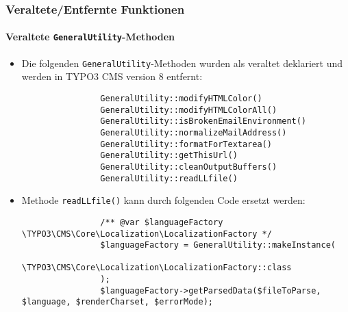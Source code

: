 \begin{frame}[fragile]
	\frametitle{Veraltete/Entfernte Funktionen}
	\framesubtitle{Veraltete \texttt{GeneralUtility}-Methoden}

	\lstset{basicstyle=\tiny\ttfamily}

	\begin{itemize}
		\item Die folgenden \texttt{GeneralUtility}-Methoden wurden als veraltet deklariert und werden in
			TYPO3 CMS version 8 entfernt:

			\begin{lstlisting}
				GeneralUtility::modifyHTMLColor()
				GeneralUtility::modifyHTMLColorAll()
				GeneralUtility::isBrokenEmailEnvironment()
				GeneralUtility::normalizeMailAddress()
				GeneralUtility::formatForTextarea()
				GeneralUtility::getThisUrl()
				GeneralUtility::cleanOutputBuffers()
				GeneralUtility::readLLfile()
			\end{lstlisting}

		\item Methode \texttt{readLLfile()} kann durch folgenden Code ersetzt werden:

			\begin{lstlisting}
				/** @var $languageFactory \TYPO3\CMS\Core\Localization\LocalizationFactory */
				$languageFactory = GeneralUtility::makeInstance(
				  \TYPO3\CMS\Core\Localization\LocalizationFactory::class
				);
				$languageFactory->getParsedData($fileToParse, $language, $renderCharset, $errorMode);
			\end{lstlisting}

	\end{itemize}

\end{frame}



